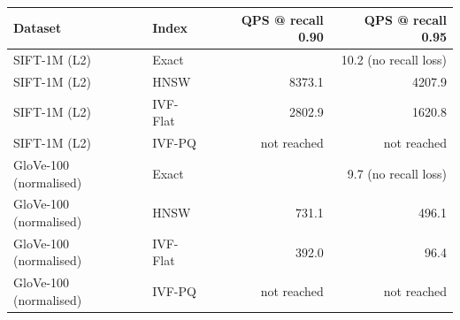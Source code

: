 \begin{tabular}{llrr}
\toprule
Dataset & Index & QPS @ recall 0.90 & QPS @ recall 0.95 \\
\midrule
SIFT-1M (L2) & Exact & \multicolumn{2}{r}{10.2 (no recall loss)} \\
SIFT-1M (L2) & HNSW & 8373.1 & 4207.9 \\
SIFT-1M (L2) & IVF-Flat & 2802.9 & 1620.8 \\
SIFT-1M (L2) & IVF-PQ & not reached & not reached \\
GloVe-100 (normalised) & Exact & \multicolumn{2}{r}{9.7 (no recall loss)} \\
GloVe-100 (normalised) & HNSW & 731.1 & 496.1 \\
GloVe-100 (normalised) & IVF-Flat & 392.0 & 96.4 \\
GloVe-100 (normalised) & IVF-PQ & not reached & not reached \\
\bottomrule
\end{tabular}
